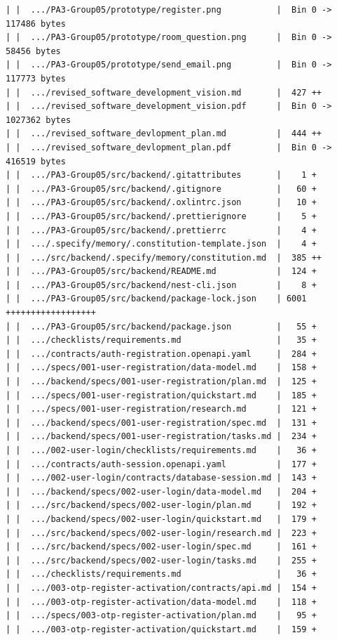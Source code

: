 \documentclass[12pt]{article}
\begin{document}
\begin{lstlisting}[numbers=none,breaklines=true]
| |  .../PA3-Group05/prototype/register.png           |  Bin 0 -> 117486 bytes
| |  .../PA3-Group05/prototype/room_question.png      |  Bin 0 -> 58456 bytes
| |  .../PA3-Group05/prototype/send_email.png         |  Bin 0 -> 117773 bytes
| |  .../revised_software_development_vision.md       |  427 ++
| |  .../revised_software_development_vision.pdf      |  Bin 0 -> 1027362 bytes
| |  .../revised_software_devlopment_plan.md          |  444 ++
| |  .../revised_software_devlopment_plan.pdf         |  Bin 0 -> 416519 bytes
| |  .../PA3-Group05/src/backend/.gitattributes       |    1 +
| |  .../PA3-Group05/src/backend/.gitignore           |   60 +
| |  .../PA3-Group05/src/backend/.oxlintrc.json       |   10 +
| |  .../PA3-Group05/src/backend/.prettierignore      |    5 +
| |  .../PA3-Group05/src/backend/.prettierrc          |    4 +
| |  .../.specify/memory/.constitution-template.json  |    4 +
| |  .../src/backend/.specify/memory/constitution.md  |  385 ++
| |  .../PA3-Group05/src/backend/README.md            |  124 +
| |  .../PA3-Group05/src/backend/nest-cli.json        |    8 +
| |  .../PA3-Group05/src/backend/package-lock.json    | 6001 ++++++++++++++++++
| |  .../PA3-Group05/src/backend/package.json         |   55 +
| |  .../checklists/requirements.md                   |   35 +
| |  .../contracts/auth-registration.openapi.yaml     |  284 +
| |  .../specs/001-user-registration/data-model.md    |  158 +
| |  .../backend/specs/001-user-registration/plan.md  |  125 +
| |  .../specs/001-user-registration/quickstart.md    |  185 +
| |  .../specs/001-user-registration/research.md      |  121 +
| |  .../backend/specs/001-user-registration/spec.md  |  131 +
| |  .../backend/specs/001-user-registration/tasks.md |  234 +
| |  .../002-user-login/checklists/requirements.md    |   36 +
| |  .../contracts/auth-session.openapi.yaml          |  177 +
| |  .../002-user-login/contracts/database-session.md |  143 +
| |  .../backend/specs/002-user-login/data-model.md   |  204 +
| |  .../src/backend/specs/002-user-login/plan.md     |  192 +
| |  .../backend/specs/002-user-login/quickstart.md   |  179 +
| |  .../src/backend/specs/002-user-login/research.md |  223 +
| |  .../src/backend/specs/002-user-login/spec.md     |  161 +
| |  .../src/backend/specs/002-user-login/tasks.md    |  255 +
| |  .../checklists/requirements.md                   |   36 +
| |  .../003-otp-register-activation/contracts/api.md |  154 +
| |  .../003-otp-register-activation/data-model.md    |  118 +
| |  .../specs/003-otp-register-activation/plan.md    |   95 +
| |  .../003-otp-register-activation/quickstart.md    |  159 +

\end{lstlisting}
\end{document}
